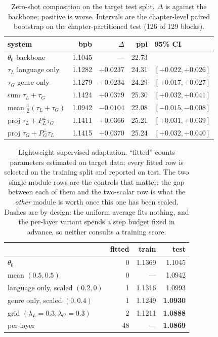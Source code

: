 \documentclass[10pt,twocolumn,a4paper]{article}
\begin{document}
\begin{table}[t]\centering\footnotesize
\setlength{\tabcolsep}{3.5pt}
\begin{tabular}{@{}lrrrl@{}}
\toprule
system & bpb & $\Delta$ & ppl & 95\% CI \\
\midrule
$\theta_0$ backbone        & 1.1045 & ---     & 22.73 & \\
$\tau_L$ language only     & 1.1282 & $+0.0237$ & 24.31 & $[+0.022,+0.026]$ \\
$\tau_G$ genre only        & 1.1279 & $+0.0234$ & 24.29 & $[+0.017,+0.027]$ \\
sum $\tau_L+\tau_G$        & 1.1424 & $+0.0379$ & 25.30 & $[+0.032,+0.041]$ \\
mean $\frac12(\tau_L+\tau_G)$ & 1.0942 & $-0.0104$ & 22.08 & $[-0.015,-0.008]$ \\
proj $\tau_L+P_L^{\perp}\tau_G$ & 1.1411 & $+0.0366$ & 25.21 & $[+0.031,+0.039]$ \\
proj $\tau_G+P_G^{\perp}\tau_L$ & 1.1415 & $+0.0370$ & 25.24 & $[+0.032,+0.040]$ \\
\bottomrule
\end{tabular}
\caption{Zero-shot composition on the target test split. $\Delta$ is against the
backbone; positive is worse. Intervals are the chapter-level paired bootstrap on
the chapter-partitioned test (126 of 129 blocks).}
\label{tab:zs}
\end{table}

\begin{table}[t]\centering\footnotesize
\setlength{\tabcolsep}{4pt}
\begin{tabular}{@{}lrrr@{}}
\toprule
 & fitted & train & test \\
\midrule
$\theta_0$                                &  0 & 1.1369 & 1.1045 \\
mean $(0.5,0.5)$                          &  0 & ---    & 1.0942 \\
language only, scaled $(0.2,0)$           &  1 & 1.1316 & 1.0993 \\
genre only, scaled $(0,0.4)$              &  1 & 1.1249 & \textbf{1.0930} \\
grid $(\lambda_L{=}0.3,\lambda_G{=}0.3)$  &  2 & 1.1211 & \textbf{1.0888} \\
per-layer                                 & 48 & ---    & \textbf{1.0869} \\
\bottomrule
\end{tabular}
\caption{Lightweight supervised adaptation. ``fitted'' counts parameters
estimated on target data; every fitted row is selected on the training split and
reported on test. The two single-module rows are the controls that matter: the
gap between each of them and the two-scalar row is what the \emph{other} module
is worth once this one has been scaled. Dashes are by design: the uniform
average fits nothing, and the per-layer variant spends a step budget fixed in
advance, so neither consults a training score.}
\label{tab:sup}
\end{table}
\end{document}
